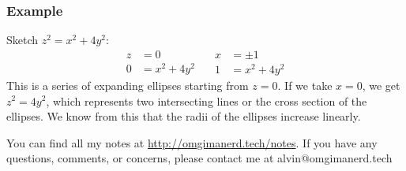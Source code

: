 \documentclass[letterpaper, 12pt]{math}
\begin{document}
\subsubsection*{Example}
Sketch \( z^2 = x^2+4y^2 \):
\[ \begin{split}
  z &= 0 \\
  0 &= x^2+4y^2
\end{split}\quad\begin{split}
  x &= \pm1 \\
  1 &= x^2+4y^2
\end{split} \]
This is a series of expanding ellipses starting from \( z = 0 \). If we take
\( x = 0 \), we get \( z^2 = 4y^2 \), which represents two intersecting lines
or the cross section of the ellipses. We know from this that the radii of the
ellipses increase linearly.

\begin{center}
  You can find all my notes at \url{http://omgimanerd.tech/notes}. If you have
  any questions, comments, or concerns, please contact me at
  alvin@omgimanerd.tech
\end{center}
\end{document}
